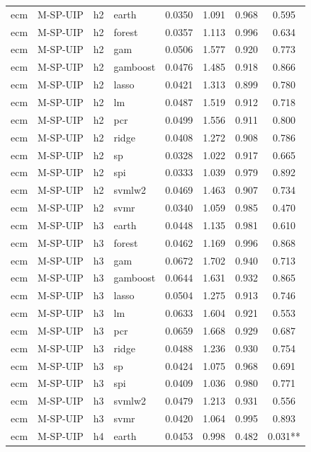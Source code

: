 \begin{ThreePartTable}
\begin{longtable}[t]{llclcccc}
\addlinespace
ecm & M-SP-UIP & h2 & earth & 0.0350 & 1.091 & 0.968 & 0.595\\
ecm & M-SP-UIP & h2 & forest & 0.0357 & 1.113 & 0.996 & 0.634\\
ecm & M-SP-UIP & h2 & gam & 0.0506 & 1.577 & 0.920 & 0.773\\
ecm & M-SP-UIP & h2 & gamboost & 0.0476 & 1.485 & 0.918 & 0.866\\
ecm & M-SP-UIP & h2 & lasso & 0.0421 & 1.313 & 0.899 & 0.780\\
ecm & M-SP-UIP & h2 & lm & 0.0487 & 1.519 & 0.912 & 0.718\\
ecm & M-SP-UIP & h2 & pcr & 0.0499 & 1.556 & 0.911 & 0.800\\
ecm & M-SP-UIP & h2 & ridge & 0.0408 & 1.272 & 0.908 & 0.786\\
ecm & M-SP-UIP & h2 & sp & 0.0328 & 1.022 & 0.917 & 0.665\\
ecm & M-SP-UIP & h2 & spi & 0.0333 & 1.039 & 0.979 & 0.892\\
ecm & M-SP-UIP & h2 & svmlw2 & 0.0469 & 1.463 & 0.907 & 0.734\\
ecm & M-SP-UIP & h2 & svmr & 0.0340 & 1.059 & 0.985 & 0.470\\
\addlinespace
ecm & M-SP-UIP & h3 & earth & 0.0448 & 1.135 & 0.981 & 0.610\\
ecm & M-SP-UIP & h3 & forest & 0.0462 & 1.169 & 0.996 & 0.868\\
ecm & M-SP-UIP & h3 & gam & 0.0672 & 1.702 & 0.940 & 0.713\\
ecm & M-SP-UIP & h3 & gamboost & 0.0644 & 1.631 & 0.932 & 0.865\\
ecm & M-SP-UIP & h3 & lasso & 0.0504 & 1.275 & 0.913 & 0.746\\
ecm & M-SP-UIP & h3 & lm & 0.0633 & 1.604 & 0.921 & 0.553\\
ecm & M-SP-UIP & h3 & pcr & 0.0659 & 1.668 & 0.929 & 0.687\\
ecm & M-SP-UIP & h3 & ridge & 0.0488 & 1.236 & 0.930 & 0.754\\
ecm & M-SP-UIP & h3 & sp & 0.0424 & 1.075 & 0.968 & 0.691\\
ecm & M-SP-UIP & h3 & spi & 0.0409 & 1.036 & 0.980 & 0.771\\
ecm & M-SP-UIP & h3 & svmlw2 & 0.0479 & 1.213 & 0.931 & 0.556\\
ecm & M-SP-UIP & h3 & svmr & 0.0420 & 1.064 & 0.995 & 0.893\\
\addlinespace
ecm & M-SP-UIP & h4 & earth & 0.0453 & 0.998 & 0.482 & 0.031**\\

\end{longtable}
\end{ThreePartTable}
